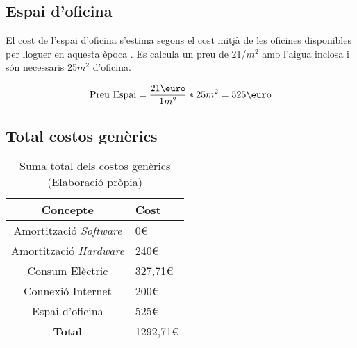 \subsection{Espai d'oficina}
El cost de l'espai d'oficina s'estima segons el cost mitjà de les oficines disponibles per lloguer en aquesta època \cite{preu-oficina}. Es calcula un preu de 21\text{\euro}/$m^2$ amb l'aigua inclosa i són necessaris 25$m^2$ d'oficina.

$$
\text{Preu Espai} = \frac{21 \text{\euro}}{1 m^2} * 25 m^2 = 525\text{\euro}
$$

\subsection{Total costos genèrics}


\begin{table}[H]
    \centering
    \begin{tabular}{c|l}
        \textbf{Concepte}     & \textbf{Cost} \\
        \hline
        Amortització \textit{Software} & 0\euro         \\
        Amortització \textit{Hardware} & 240\euro       \\
        Consum Elèctric                & 327,71\euro    \\
        Connexió Internet              & 200\euro       \\
        Espai d'oficina                & 525\euro       \\
        \hline
        \textbf{Total}                 & 1292,71\euro   \\
    \end{tabular}
    \caption[Costos genèrics]{Suma total dels costos genèrics \\ (Elaboració pròpia)}
    \label{tab:costos_generics}
\end{table}
